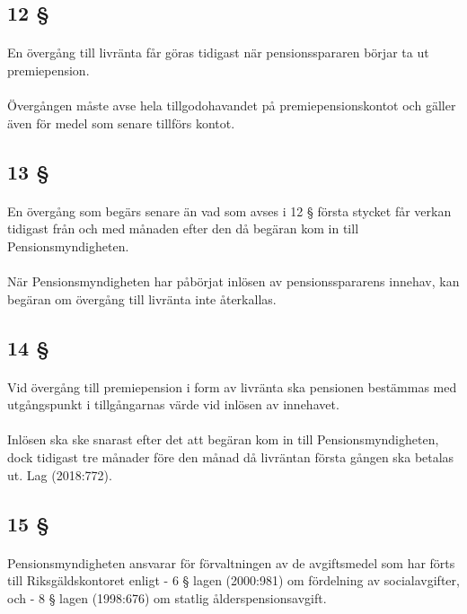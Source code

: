 \documentclass[a4paper,notitlepage,openany,10pt]{book}
\begin{document}
\subsection*{12 §}
\paragraph*{}
En övergång till livränta får göras tidigast när pensionsspararen börjar ta ut premiepension.
\paragraph*{}
Övergången måste avse hela tillgodohavandet på premiepensionskontot och gäller även för medel som senare tillförs kontot.
\subsection*{13 §}
\paragraph*{}
En övergång som begärs senare än vad som avses i 12 § första stycket får verkan tidigast från och med månaden efter den då begäran kom in till Pensionsmyndigheten.
\paragraph*{}
När Pensionsmyndigheten har påbörjat inlösen av pensionsspararens innehav, kan begäran om övergång till livränta inte återkallas.
\subsection*{14 §}
\paragraph*{}
Vid övergång till premiepension i form av livränta ska pensionen bestämmas med utgångspunkt i tillgångarnas värde vid inlösen av innehavet.
\paragraph*{}
Inlösen ska ske snarast efter det att begäran kom in till Pensionsmyndigheten, dock tidigast tre månader före den månad då livräntan första gången ska betalas ut.
Lag (2018:772).
\subsection*{15 §}
\paragraph*{}
Pensionsmyndigheten ansvarar för förvaltningen av de avgiftsmedel som har förts till Riksgäldskontoret enligt
\newline - 6 § lagen (2000:981) om fördelning av socialavgifter, och
\newline - 8 § lagen (1998:676) om statlig ålderspensionsavgift.
\end{document}
